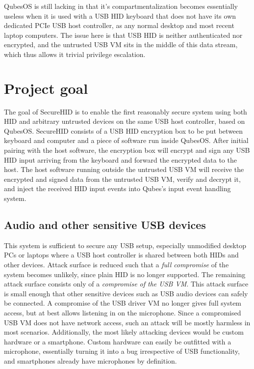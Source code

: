 \documentclass[12pt,a4paper,notitlepage]{article}
\begin{document}
QubesOS is still lacking in that it's compartmentalization becomes essentially useless when it is used with a USB HID
keyboard that does not have its own dedicated PCIe USB host controller, as any normal desktop and most recent laptop
computers. The issue here is that USB HID is neither authenticated nor encrypted, and the untrusted USB VM sits in the
middle of this data stream, which thus allows it trivial privilege escalation.

\section{Project goal}
The goal of SecureHID is to enable the first reasonably secure system using both HID and arbitrary untrusted devices on
the same USB host controller, based on QubesOS. SecureHID consists of a USB HID encryption box to be put between
keyboard and computer and a piece of software run inside QubesOS. After initial pairing with the host software, the
encryption box will encrypt and sign any USB HID input arriving from the keyboard and forward the encrypted data to the
host. The host software running outside the untrusted USB VM will receive the encrypted and signed data from the
untrusted USB VM, verify and decrypt it, and inject the received HID input events into Qubes's input event handling
system.

\subsection{Audio and other sensitive USB devices}
This system is sufficient to secure any USB setup, especially unmodified desktop PCs or laptops where a USB host
controller is shared between both HIDs and other devices. Attack surface is reduced such that a \emph{full compromise}
of the system becomes unlikely, since plain HID is no longer supported. The remaining attack surface consists only of a
\emph{compromise of the USB VM}. This attack surface is small enough that other sensitive devices such as USB audio
devices can safely be connected. A compromise of the USB driver VM no longer gives full system access, but at best
allows listening in on the microphone. Since a compromised USB VM does not have network access, such an attack will be
mostly harmless in most scenarios. Additionally, the most likely attacking devices would be custom hardware or a
smartphone. Custom hardware can easily be outfitted with a microphone, essentially turning it into a bug irrespective of
USB functionality, and smartphones already have microphones by definition.
\end{document}
